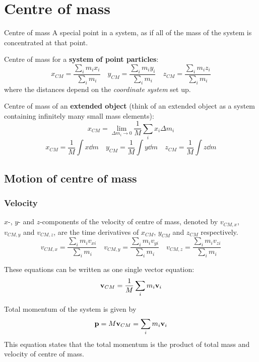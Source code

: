 \section{Centre of mass}
\begin{defn}{Centre of mass}{}
A special point in a system, as if all of the mass of the system is concentrated at that point. 
\end{defn}

Centre of mass for a \textbf{system of point particles}:
\begin{equation}
x_{CM} = \frac{\sum_i m_i x_i}{\sum_i m_i} \quad 
y_{CM} = \frac{\sum_i m_i y_i}{\sum_i m_i} \quad
z_{CM} = \frac{\sum_i m_i z_i}{\sum_i m_i}
\end{equation}
where the distances depend on the \emph{coordinate system} set up.

Centre of mass of an \textbf{extended object} (think of an extended object as a system containing infinitely many small mass elements):
\[ x_{CM} = \lim_{\Delta m_i \to 0} \frac{1}{M} \sum_i x_i \Delta m_i \]
\begin{equation}
x_{CM} = \frac{1}{M} \int x \dd{m} \quad
y_{CM} = \frac{1}{M} \int y \dd{m} \quad
z_{CM} = \frac{1}{M} \int z \dd{m}
\end{equation}

\subsection{Motion of centre of mass}
\subsubsection{Velocity}
$x$-, $y$- and $z$-components of the velocity of centre of mass, denoted by $v_{CM,x}$, $v_{CM,y}$ and $v_{CM,z}$, are the time derivatives of $x_{CM}$, $y_{CM}$ and $z_{CM}$ respectively.
\begin{equation}
v_{CM,x} = \frac{\sum_i m_i v_{xi}}{\sum_i m_i} \quad 
v_{CM,y} = \frac{\sum_i m_i v_{yi}}{\sum_i m_i} \quad
v_{CM,z} = \frac{\sum_i m_i v_{zi}}{\sum_i m_i}
\end{equation}

These equations can be written as one single vector equation:
\begin{equation}
\vb{v}_{CM} = \frac{1}{M}\sum_{i}m_i\vb{v}_i
\end{equation}

Total momentum of the system is given by
\begin{equation}
\vb{p} = M\vb{v}_{CM} = \sum_{i}m_i\vb{v}_i
\end{equation}
This equation states that the total momentum is the product of total mass and velocity of centre of mass.

